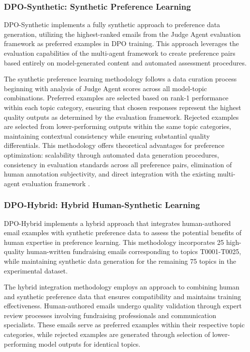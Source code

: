 \subsubsection{DPO-Synthetic: Synthetic Preference Learning}

DPO-Synthetic implements a fully synthetic approach to preference data generation, utilizing the highest-ranked emails from the Judge Agent evaluation framework as preferred examples in DPO training. This approach leverages the evaluation capabilities of the multi-agent framework to create preference pairs based entirely on model-generated content and automated assessment procedures.

The synthetic preference learning methodology follows a data curation process beginning with analysis of Judge Agent scores across all model-topic combinations. Preferred examples are selected based on rank-1 performance within each topic category, ensuring that chosen responses represent the highest quality outputs as determined by the evaluation framework. Rejected examples are selected from lower-performing outputs within the same topic categories, maintaining contextual consistency while ensuring substantial quality differentials. This methodology offers theoretical advantages for preference optimization: scalability through automated data generation procedures, consistency in evaluation standards across all preference pairs, elimination of human annotation subjectivity, and direct integration with the existing multi-agent evaluation framework \cite{liu2024rs_dpo}.

\subsubsection{DPO-Hybrid: Hybrid Human-Synthetic Learning}

DPO-Hybrid implements a hybrid approach that integrates human-authored email examples with synthetic preference data to assess the potential benefits of human expertise in preference learning. This methodology incorporates 25 high-quality human-written fundraising emails corresponding to topics T0001-T0025, while maintaining synthetic data generation for the remaining 75 topics in the experimental dataset.

The hybrid integration methodology employs an approach to combining human and synthetic preference data that ensures compatibility and maintains training effectiveness. Human-authored emails undergo quality validation through expert review processes involving fundraising professionals and communication specialists. These emails serve as preferred examples within their respective topic categories, while rejected examples are generated through selection of lower-performing model outputs for identical topics.

